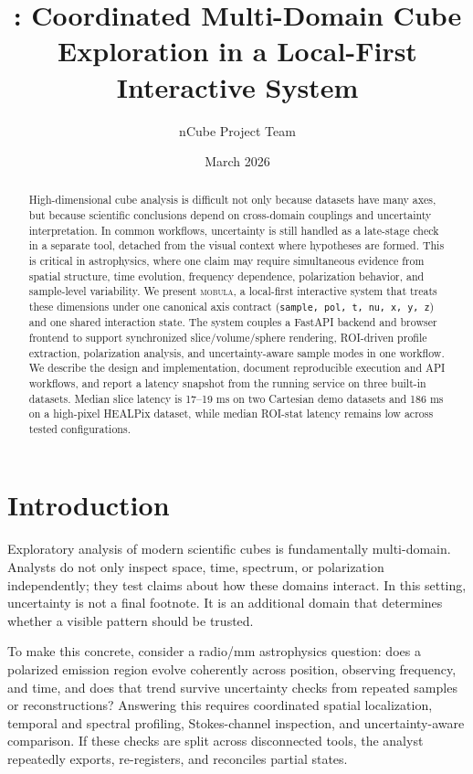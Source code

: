 \documentclass[11pt]{article}
\title{\tool: Coordinated Multi-Domain Cube Exploration in a Local-First Interactive System}
\author{nCube Project Team}
\date{March 2026}
\newcommand{\tool}{\textsc{mobula}}
\begin{document}
\maketitle

\begin{abstract}
High-dimensional cube analysis is difficult not only because datasets have many axes, but because scientific conclusions depend on cross-domain couplings and uncertainty interpretation. In common workflows, uncertainty is still handled as a late-stage check in a separate tool, detached from the visual context where hypotheses are formed. This is critical in astrophysics, where one claim may require simultaneous evidence from spatial structure, time evolution, frequency dependence, polarization behavior, and sample-level variability. We present \tool, a local-first interactive system that treats these dimensions under one canonical axis contract (\texttt{sample, pol, t, nu, x, y, z}) and one shared interaction state. The system couples a FastAPI backend and browser frontend to support synchronized slice/volume/sphere rendering, ROI-driven profile extraction, polarization analysis, and uncertainty-aware sample modes in one workflow. We describe the design and implementation, document reproducible execution and API workflows, and report a latency snapshot from the running service on three built-in datasets. Median slice latency is 17--19 ms on two Cartesian demo datasets and 186 ms on a high-pixel HEALPix dataset, while median ROI-stat latency remains low across tested configurations.
\end{abstract}

\section{Introduction}
Exploratory analysis of modern scientific cubes is fundamentally multi-domain. Analysts do not only inspect space, time, spectrum, or polarization independently; they test claims about how these domains interact. In this setting, uncertainty is not a final footnote. It is an additional domain that determines whether a visible pattern should be trusted.

To make this concrete, consider a radio/mm astrophysics question: does a polarized emission region evolve coherently across position, observing frequency, and time, and does that trend survive uncertainty checks from repeated samples or reconstructions? Answering this requires coordinated spatial localization, temporal and spectral profiling, Stokes-channel inspection, and uncertainty-aware comparison. If these checks are split across disconnected tools, the analyst repeatedly exports, re-registers, and reconciles partial states.
\end{document}
